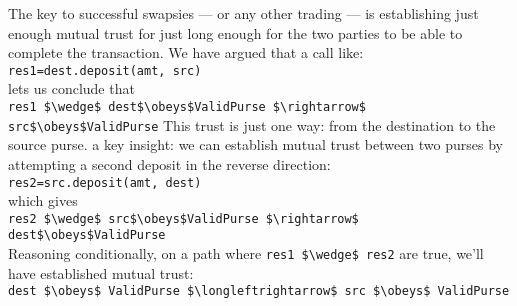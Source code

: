 
The key to successful swapsies --- or any other trading --- is
establishing just enough mutual trust for just long enough for the two
parties %
to be able to complete the transaction.
We have argued that
a call like:\\
%
\SP \lstinline+res1=dest.deposit(amt, src)+\\
%
\noindent lets us conclude that\\
%
\SP \lstinline+res1 $\wedge$ dest$\obeys$ValidPurse $\rightarrow$ src$\obeys$ValidPurse+
%
 This trust %
   is
just one way: from the destination to the source purse.
  a key insight: we can
establish mutual trust between two purses by attempting a second
deposit in the reverse direction:\\
%
\SP \lstinline+res2=src.deposit(amt, dest)+\\
%
\noindent which gives\\
%
\SP  \lstinline+res2 $\wedge$ src$\obeys$ValidPurse $\rightarrow$ dest$\obeys$ValidPurse+\\
%
\noindent Reasoning conditionally, on a path where \lstinline+res1 $\wedge$ res2+ are
true, we'll have %
%
%
%
%
 established mutual trust:\\
%
\SP    \lstinline+dest $\obeys$ ValidPurse $\longleftrightarrow$ src $\obeys$ ValidPurse+
%

